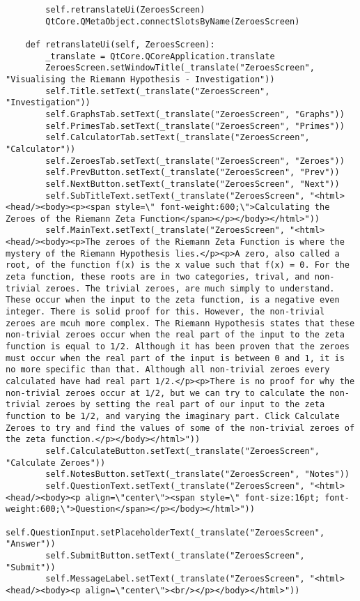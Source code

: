 \documentclass{article}
\begin{document}
\begin{lstlisting}
        self.retranslateUi(ZeroesScreen)
        QtCore.QMetaObject.connectSlotsByName(ZeroesScreen)

    def retranslateUi(self, ZeroesScreen):
        _translate = QtCore.QCoreApplication.translate
        ZeroesScreen.setWindowTitle(_translate("ZeroesScreen", "Visualising the Riemann Hypothesis - Investigation"))
        self.Title.setText(_translate("ZeroesScreen", "Investigation"))
        self.GraphsTab.setText(_translate("ZeroesScreen", "Graphs"))
        self.PrimesTab.setText(_translate("ZeroesScreen", "Primes"))
        self.CalculatorTab.setText(_translate("ZeroesScreen", "Calculator"))
        self.ZeroesTab.setText(_translate("ZeroesScreen", "Zeroes"))
        self.PrevButton.setText(_translate("ZeroesScreen", "Prev"))
        self.NextButton.setText(_translate("ZeroesScreen", "Next"))
        self.SubTitleText.setText(_translate("ZeroesScreen", "<html><head/><body><p><span style=\" font-weight:600;\">Calculating the Zeroes of the Riemann Zeta Function</span></p></body></html>"))
        self.MainText.setText(_translate("ZeroesScreen", "<html><head/><body><p>The zeroes of the Riemann Zeta Function is where the mystery of the Riemann Hypothesis lies.</p><p>A zero, also called a root, of the function f(x) is the x value such that f(x) = 0. For the zeta function, these roots are in two categories, trival, and non-trivial zeroes. The trivial zeroes, are much simply to understand. These occur when the input to the zeta function, is a negative even integer. There is solid proof for this. However, the non-trivial zeroes are mcuh more complex. The Riemann Hypothesis states that these non-trivial zeroes occur when the real part of the input to the zeta function is equal to 1/2. Although it has been proven that the zeroes must occur when the real part of the input is between 0 and 1, it is no more specific than that. Although all non-trivial zeroes every calculated have had real part 1/2.</p><p>There is no proof for why the non-trivial zeroes occur at 1/2, but we can try to calculate the non-trivial zeroes by setting the real part of our input to the zeta function to be 1/2, and varying the imaginary part. Click Calculate Zeroes to try and find the values of some of the non-trivial zeroes of the zeta function.</p></body></html>"))
        self.CalculateButton.setText(_translate("ZeroesScreen", "Calculate Zeroes"))
        self.NotesButton.setText(_translate("ZeroesScreen", "Notes"))
        self.QuestionText.setText(_translate("ZeroesScreen", "<html><head/><body><p align=\"center\"><span style=\" font-size:16pt; font-weight:600;\">Question</span></p></body></html>"))
        self.QuestionInput.setPlaceholderText(_translate("ZeroesScreen", "Answer"))
        self.SubmitButton.setText(_translate("ZeroesScreen", "Submit"))
        self.MessageLabel.setText(_translate("ZeroesScreen", "<html><head/><body><p align=\"center\"><br/></p></body></html>"))
\end{lstlisting}
\end{document}
